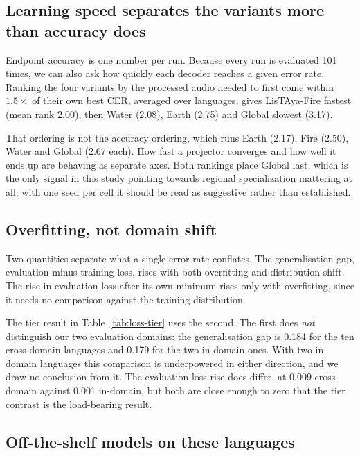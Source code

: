 \documentclass[11pt]{article}
\begin{document}
\subsection{Learning speed separates the variants more than accuracy does}
\label{sec:efficiency}

Endpoint accuracy is one number per run. Because every run is evaluated 101 times, we can also
ask how quickly each decoder reaches a given error rate. Ranking the four variants by the
processed audio needed to first come within $1.5\times$ of their own best CER, averaged over
languages, gives LisTAya-Fire fastest (mean rank 2.00), then Water (2.08), Earth (2.75) and
Global slowest (3.17).

That ordering is not the accuracy ordering, which runs Earth (2.17), Fire (2.50), Water and
Global (2.67 each). How fast a projector converges and how well it ends up are behaving as
separate axes. Both rankings place Global last, which is the only signal in this study pointing
towards regional specialization mattering at all; with one seed per cell it should be read as
suggestive rather than established.

\subsection{Overfitting, not domain shift}
\label{sec:domain}

Two quantities separate what a single error rate conflates. The generalisation gap, evaluation
minus training loss, rises with both overfitting and distribution shift. The rise in evaluation
loss after its own minimum rises only with overfitting, since it needs no comparison against the
training distribution.

The tier result in Table~\ref{tab:loss-tier} uses the second. The first does \emph{not}
distinguish our two evaluation domains: the generalisation gap is 0.184 for the ten
cross-domain languages and 0.179 for the two in-domain ones. With two in-domain languages this
comparison is underpowered in either direction, and we draw no conclusion from it. The
evaluation-loss rise does differ, at 0.009 cross-domain against 0.001 in-domain, but both are
close enough to zero that the tier contrast is the load-bearing result.

\subsection{Off-the-shelf models on these languages}
\label{sec:baselines-full}
\end{document}
